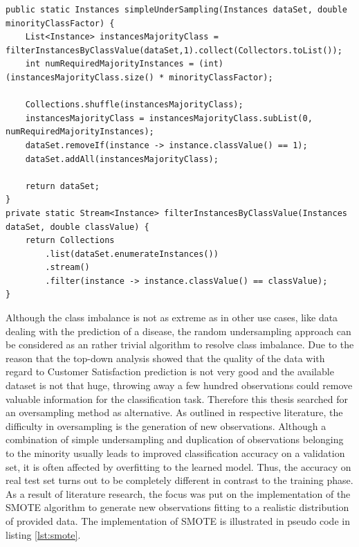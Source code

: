 \begin{lstlisting}[caption={Implementation of a random undersampling method}, label={lst:simpleUndersampling}]
public static Instances simpleUnderSampling(Instances dataSet, double minorityClassFactor) {
	List<Instance> instancesMajorityClass = filterInstancesByClassValue(dataSet,1).collect(Collectors.toList());
	int numRequiredMajorityInstances = (int) (instancesMajorityClass.size() * minorityClassFactor);
	
	Collections.shuffle(instancesMajorityClass);
	instancesMajorityClass = instancesMajorityClass.subList(0, numRequiredMajorityInstances);
	dataSet.removeIf(instance -> instance.classValue() == 1);
	dataSet.addAll(instancesMajorityClass);

	return dataSet;
}
private static Stream<Instance> filterInstancesByClassValue(Instances dataSet, double classValue) {
	return Collections
		.list(dataSet.enumerateInstances())
		.stream()
		.filter(instance -> instance.classValue() == classValue);
}
\end{lstlisting}

Although the class imbalance is not as extreme as in other use cases, like data dealing with the prediction of a disease, the random undersampling approach can be considered as an rather trivial algorithm to resolve class imbalance. Due to the reason that the top-down analysis showed that the quality of the data with regard to Customer Satisfaction prediction is not very good and the available dataset is not that huge, throwing away a few hundred observations could remove valuable information for the classification task. Therefore this thesis searched for an oversampling method as alternative. As outlined in respective literature, the difficulty in oversampling is the generation of new observations. Although a combination of simple undersampling and duplication of observations belonging to the minority usually leads to improved classification accuracy on a validation set, it is often affected by overfitting to the learned model. Thus, the accuracy on real test set turns out to be completely different in contrast to the training phase. As a result of literature research, the focus was put on the implementation of the SMOTE algorithm to generate new observations fitting to a realistic distribution of provided data. The implementation of SMOTE is illustrated in pseudo code in listing \ref{lst:smote}. 

